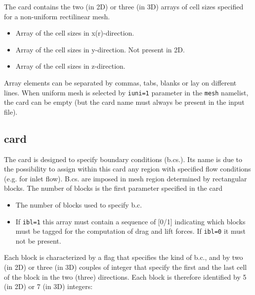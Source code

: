 The  card contains the two (in 2D) or three (in 3D) arrays of cell 
sizes specified for a non-uniform rectilinear mesh. 

\begin{itemize}
\item
{}
{Array of the cell sizes in x(r)-direction.}

\item
{}
{Array of the cell sizes in y-direction.
Not present in 2D.}

\item
{}
{Array of the cell sizes in z-direction.}
\end{itemize}

Array elements can be separated by commas, tabs, blanks or lay on different
lines.  When uniform mesh is selected by {\tt iuni=1} parameter in the 
{\tt mesh} namelist, the card can be empty (but the card 
name must always be present in the input file).

\subsection{ card}

The  card is designed to specify boundary conditions (b.cs.).
Its name is due to the possibility to assign within this card any region with
specified flow conditions (e.g. for inlet flow). B.cs. are imposed in 
mesh region determined by rectangular blocks. The number of blocks is the
first parameter specified in the card

\begin{itemize}
\item
{}
{The number of blocks used to specify b.c.}
\item
{}
{If {\tt ibl=1} this array must contain a sequence of [0/1] indicating which
blocks must be tagged for the computation of drag and lift forces. If
{\tt ibl=0} it must not be present.}
\end{itemize}

Each block is characterized
by a flag that specifies the kind of b.c., and by two (in 2D) or three (in 3D)
couples of integer that specify the first and the last cell of the block in 
the two (three) directions. Each block is therefore identified by 5 (in 2D)
or 7 (in 3D) integers:\\

